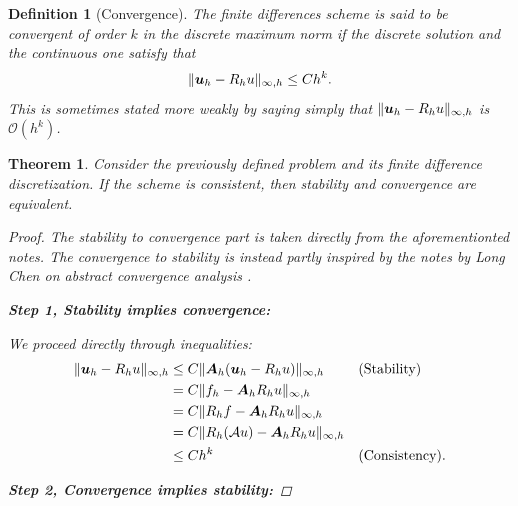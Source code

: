 \documentclass{article}
\renewcommand{\vec}{\vectorsym}
\newcommand{\mat}{\matrixsym}
\newtheorem{definition}{Definition}
\newtheorem{theorem}{Theorem}
\begin{document}
\begin{definition}[Convergence]
    The finite differences scheme is said to be convergent of order $k$ in the discrete maximum norm if the discrete solution and the continuous one satisfy that 
    $$ \| \vec u_h - R_hu \|_{\infty,h} \leq C h^k. $$
This is sometimes stated more weakly by saying simply that $\| \vec u_h - R_hu \|_{\infty,h}$ is $\mathcal O(h^k)$. 
\end{definition}

\begin{theorem}
    Consider the previously defined problem and its finite difference discretization. If the scheme is consistent, then stability and convergence are equivalent. 
    \begin{proof}
        The stability to convergence part is taken directly from the aforementionted notes. The convergence to stability is instead partly inspired by the notes by Long Chen on abstract convergence analysis \cite{chenLFDM}.
        
        {\bf Step 1, Stability implies convergence:}

        We proceed directly through inequalities:
        \begin{align*}
            \| \vec u_h - R_h u\|_{\infty,h} &\leq C\|\mat A_h(\vec u_h - R_hu) \|_{\infty,h} && \text{(Stability)} \\
                                             &=C \| f_h - \mat A_hR_h u \|_{\infty,h} && \\
                                             &=C \| R_h f - \mat A_hR_h u\|_{\infty,h} &&\\
                                             &=C \|R_h(\mathcal A u) - \mat A_hR_h u\|_{\infty,h}&& \\
                                             &\leq Ch^k && \text{(Consistency)}.
        \end{align*}

        {\bf Step 2, Convergence implies stability:}


\end{proof}
\end{theorem}
\end{document}
